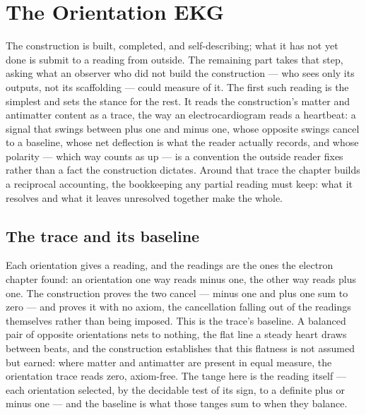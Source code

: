 \chapter{The Orientation EKG}
\label{chap:orientation-ekg}

The construction is built, completed, and self-describing; what it has not yet done is submit to a
reading from outside. The remaining part takes that step, asking what an observer who did not build the
construction --- who sees only its outputs, not its scaffolding --- could measure of it. The first such
reading is the simplest and sets the stance for the rest. It reads the construction's matter and
antimatter content as a trace, the way an electrocardiogram reads a heartbeat: a signal that swings
between plus one and minus one, whose opposite swings cancel to a baseline, whose net deflection is what
the reader actually records, and whose polarity --- which way counts as up --- is a convention the
outside reader fixes rather than a fact the construction dictates. Around that trace the chapter builds a
reciprocal accounting, the bookkeeping any partial reading must keep: what it resolves and what it leaves
unresolved together make the whole.

\section{The trace and its baseline}
\label{se:the-trace-and-its-baseline}

Each orientation gives a reading, and the readings are the ones the electron chapter found: an
orientation one way reads minus one, the other way reads plus one. The construction proves the two cancel
--- minus one and plus one sum to zero --- and proves it with no axiom, the cancellation falling out of
the readings themselves rather than being imposed. This is the trace's baseline. A balanced pair of
opposite orientations nets to nothing, the flat line a steady heart draws between beats, and the
construction establishes that this flatness is not assumed but earned: where matter and antimatter are
present in equal measure, the orientation trace reads zero, axiom-free. The tange here is the reading
itself --- each orientation selected, by the decidable test of its sign, to a definite plus or minus
one --- and the baseline is what those tanges sum to when they balance.

